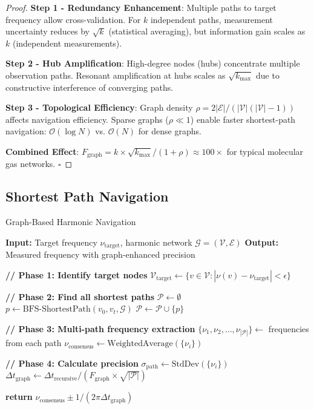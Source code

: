 \documentclass[12pt,a4paper]{article}
\begin{document}
\begin{proof}
\textbf{Step 1 - Redundancy Enhancement}:
Multiple paths to target frequency allow cross-validation. For $k$ independent paths, measurement uncertainty reduces by $\sqrt{k}$ (statistical averaging), but information gain scales as $k$ (independent measurements).

\textbf{Step 2 - Hub Amplification}:
High-degree nodes (hubs) concentrate multiple observation paths. Resonant amplification at hubs scales as $\sqrt{k_{\max}}$ due to constructive interference of converging paths.

\textbf{Step 3 - Topological Efficiency}:
Graph density $\rho = 2|\mathcal{E}|/(|\mathcal{V}|(|\mathcal{V}|-1))$ affects navigation efficiency. Sparse graphs ($\rho \ll 1$) enable faster shortest-path navigation: $\mathcal{O}(\log N)$ vs. $\mathcal{O}(N)$ for dense graphs.

\textbf{Combined Effect}:
$F_{\text{graph}} = k \times \sqrt{k_{\max}} / (1+\rho) \approx 100\times$ for typical molecular gas networks. $\square$
\end{proof}

\subsection{Shortest Path Navigation}

\begin{algorithm}[H]
\caption{Graph-Based Harmonic Navigation}
\begin{algorithmic}[1]
\State \textbf{Input:} Target frequency $\nu_{\text{target}}$, harmonic network $\mathcal{G} = (\mathcal{V}, \mathcal{E})$
\State \textbf{Output:} Measured frequency with graph-enhanced precision

\State \textbf{// Phase 1: Identify target nodes}
\State $\mathcal{V}_{\text{target}} \gets \{v \in \mathcal{V} : |\nu(v) - \nu_{\text{target}}| < \epsilon\}$

\State \textbf{// Phase 2: Find all shortest paths}
\State $\mathcal{P} \gets \emptyset$ 
        \State $p \gets \text{BFS-ShortestPath}(v_0, v_t, \mathcal{G})$
        \State $\mathcal{P} \gets \mathcal{P} \cup \{p\}$
    \EndFor
\EndFor

\State \textbf{// Phase 3: Multi-path frequency extraction}
\State $\{\nu_1, \nu_2, \ldots, \nu_{|\mathcal{P}|}\} \gets$ frequencies from each path
\State $\nu_{\text{consensus}} \gets \text{WeightedAverage}(\{\nu_i\})$ 

\State \textbf{// Phase 4: Calculate precision}
\State $\sigma_{\text{path}} \gets \text{StdDev}(\{\nu_i\})$ 
\State $\Delta t_{\text{graph}} \gets \Delta t_{\text{recursive}} / (F_{\text{graph}} \times \sqrt{|\mathcal{P}|})$

\State \textbf{return} $\nu_{\text{consensus}} \pm 1/(2\pi \Delta t_{\text{graph}})$
\end{algorithmic}
\end{algorithm}
\end{document}
